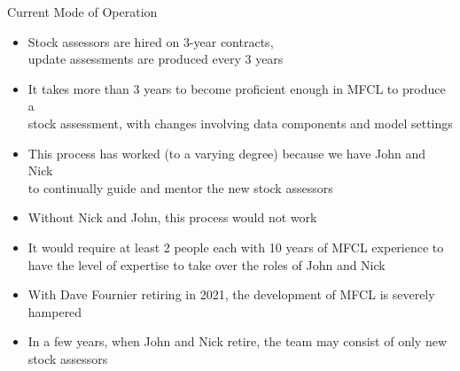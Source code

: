 \documentclass[aspectratio=169]{beamer}
\begin{document}
\begin{frame}{Current Mode of Operation}\fns
  \begin{itemize}
    \item[] Stock assessors are hired on 3-year contracts,\\
    update assessments are produced every 3 years\\[3ex]

    \item[] It takes more than 3 years to become proficient enough in MFCL to
    produce a\\
    stock assessment, with changes involving data components and model
    settings\\[3ex]

    \item[] This process has worked (to a varying degree) because we have John
    and Nick\\
    to continually guide and mentor the new stock assessors\\[3ex]

    \item[] Without Nick and John, this process would not work\\[3ex]

    \item[] It would require at least 2 people each with 10 years of MFCL
    experience to\\
    have the level of expertise to take over the roles of John and Nick\\[3ex]

    \item[] With Dave Fournier retiring in 2021, the development of MFCL is
    severely hampered\\[3ex]

    \item[] In a few years, when John and Nick retire, the team may consist of
    only new stock assessors\\[3ex]
  \end{itemize}
\end{frame}

\end{document}
